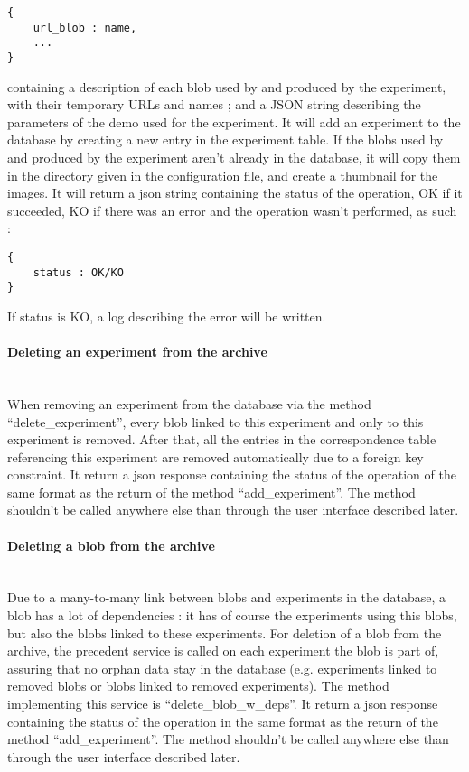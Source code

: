 \begin{verbatim}
{
    url_blob : name,
    ...
}
\end{verbatim}

containing a description of each blob used by and produced by the experiment, with their temporary URLs and names ; and a JSON string describing the parameters of the demo used for the experiment. It will add an experiment to the database by creating a new entry in the experiment table. If the blobs used by and produced by the experiment aren't already in the database, it will copy them in the directory given in the configuration file, and create a thumbnail for the images. It will return a json string containing the status of the operation, OK if it succeeded, KO if there was an error and the operation wasn't performed, as such :

\begin{verbatim}
{
    status : OK/KO
}
\end{verbatim}

If status is KO, a log describing the error will be written.

\paragraph{Deleting an experiment from the archive} \hspace{0pt} \\
When removing an experiment from the database via the method ``delete\_experiment'', every blob linked to this experiment and only to this experiment is removed. After that, all the entries in the correspondence table referencing this experiment are removed automatically due to a foreign key constraint. It return a json response containing the status of the operation of the same format as the return of the method ``add\_experiment''. The method shouldn't be called anywhere else than through the user interface described later.

\paragraph{Deleting a blob from the archive} \hspace{0pt} \\
Due to a many-to-many link between blobs and experiments in the database, a blob has a lot of dependencies : it has of course the experiments using this blobs, but also the blobs linked to these experiments. For deletion of a blob from the archive, the precedent service is called on each experiment the blob is part of, assuring that no orphan data stay in the database (e.g. experiments linked to removed blobs or blobs linked to removed experiments). The method implementing this service is ``delete\_blob\_w\_deps''. It return a json response containing the status of the operation in the same format as the return of the method ``add\_experiment''. The method shouldn't be called anywhere else than through the user interface described later.

